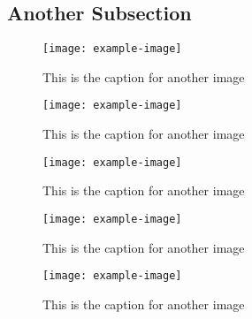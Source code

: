 \subsection{Another Subsection}
    \lipsum[3-5]
    \begin{figure}
        \centering
        \texttt{[image: example-image]}
        \captionsetup{width=3.5in}
        \caption{This is the caption for another image}
    \end{figure}
    \begin{figure}
        \centering
        \texttt{[image: example-image]}
        \captionsetup{width=3.5in}
        \caption{This is the caption for another image}
    \end{figure}
    \begin{figure}
        \centering
        \texttt{[image: example-image]}
        \captionsetup{width=3.5in}
        \caption{This is the caption for another image}
    \end{figure}
    \begin{figure}
        \centering
        \texttt{[image: example-image]}
        \captionsetup{width=3.5in}
        \caption{This is the caption for another image}
    \end{figure}
    \begin{figure}
        \centering
        \texttt{[image: example-image]}
        \captionsetup{width=3.5in}
        \caption{This is the caption for another image}
    \end{figure}

